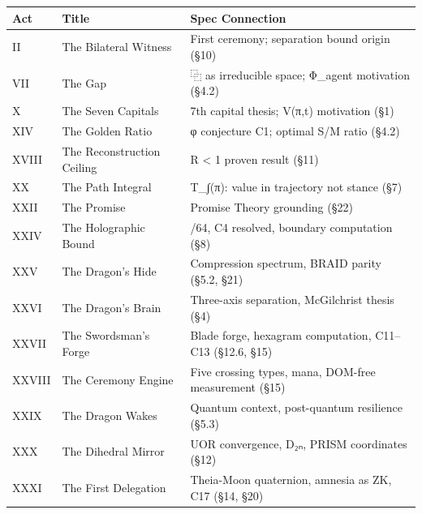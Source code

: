 \documentclass[
  11pt,
]{article}
\newcounter{none} %
\begin{document}
{\def\LTcaptype{none} %
\begin{longtable}[]{@{}
  >{\raggedright\arraybackslash}p{}
  >{\raggedright\arraybackslash}p{}
  >{\raggedright\arraybackslash}p{}@{}}
\toprule\noalign{}
\begin{minipage}[b]{\linewidth}\raggedright
Act
\end{minipage} & \begin{minipage}[b]{\linewidth}\raggedright
Title
\end{minipage} & \begin{minipage}[b]{\linewidth}\raggedright
Spec Connection
\end{minipage} \\
\midrule\noalign{}
\endhead
\bottomrule\noalign{}
\endlastfoot
II & The Bilateral Witness & First ceremony; separation bound origin
(§10) \\
VII & The Gap & ⿻ as irreducible space; Φ\_agent motivation (§4.2) \\
X & The Seven Capitals & 7th capital thesis; V(π,t) motivation (§1) \\
XIV & The Golden Ratio & φ conjecture C1; optimal S/M ratio (§4.2) \\
XVIII & The Reconstruction Ceiling & R \textless{} 1 proven result
(§11) \\
XX & The Path Integral & T\_∫(π): value in trajectory not stance (§7) \\
XXII & The Promise & Promise Theory grounding (§22) \\
XXIV & The Holographic Bound & 96/64, C4 resolved, boundary computation
(§8) \\
XXV & The Dragon's Hide & Compression spectrum, BRAID parity (§5.2,
§21) \\
XXVI & The Dragon's Brain & Three-axis separation, McGilchrist thesis
(§4) \\
XXVII & The Swordsman's Forge & Blade forge, hexagram computation,
C11--C13 (§12.6, §15) \\
XXVIII & The Ceremony Engine & Five crossing types, mana, DOM-free
measurement (§15) \\
XXIX & The Dragon Wakes & Quantum context, post-quantum resilience
(§5.3) \\
XXX & The Dihedral Mirror & UOR convergence, D₂ₙ, PRISM coordinates
(§12) \\
XXXI & The First Delegation & Theia-Moon quaternion, amnesia as ZK, C17
(§14, §20) \\
\end{longtable}
}
\end{document}
